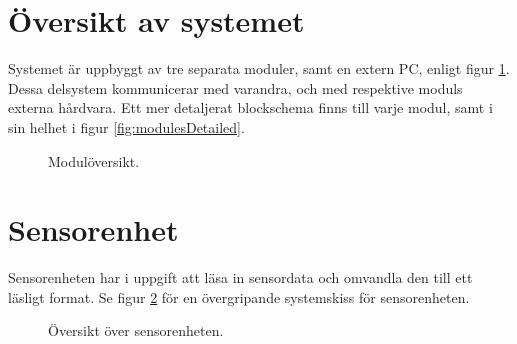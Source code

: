 \documentclass[a4paper,11pt]{article}
\begin{document}
\newpage
\section{Översikt av systemet}
Systemet är uppbyggt av tre separata moduler, samt en extern PC, enligt figur \ref{fig:modules}. Dessa delsystem kommunicerar med varandra, och med respektive moduls externa hårdvara. Ett mer detaljerat blockschema finns till varje modul, samt i sin helhet i figur \ref{fig:modulesDetailed}.
\begin{figure}[h!]
    \caption{Modulöversikt.}
    \label{fig:modules}
\end{figure}

\newpage
\section{Sensorenhet}
Sensorenheten har i uppgift att läsa in sensordata och omvandla den till ett läsligt format. Se figur \ref{fig:unitSensor} för en övergripande systemskiss för sensorenheten.
\begin{figure}[h!]
    \caption{Översikt över sensorenheten.}
    \label{fig:unitSensor}
\end{figure}
\end{document}

